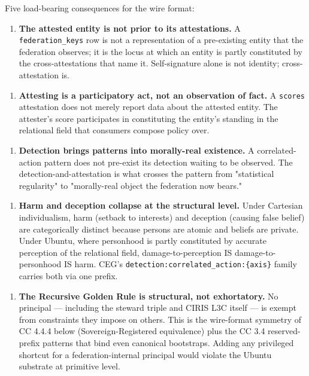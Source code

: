 \documentclass[11pt]{article}
\begin{document}
Five load-bearing consequences for the wire format:


\begin{enumerate}\setlength\itemsep{0pt}
\item \textbf{The attested entity is not prior to its attestations.} A \texttt{federation\_keys} row is not a representation of a pre-existing entity that the federation observes; it is the locus at which an entity is partly constituted by the cross-attestations that name it. Self-signature alone is not identity; cross-attestation is.
\end{enumerate}


\begin{enumerate}\setlength\itemsep{0pt}
\item \textbf{Attesting is a participatory act, not an observation of fact.} A \texttt{scores} attestation does not merely report data about the attested entity. The attester's score participates in constituting the entity's standing in the relational field that consumers compose policy over.
\end{enumerate}


\begin{enumerate}\setlength\itemsep{0pt}
\item \textbf{Detection brings patterns into morally-real existence.} A correlated-action pattern does not pre-exist its detection waiting to be observed. The detection-and-attestation is what crosses the pattern from "statistical regularity" to "morally-real object the federation now bears."
\end{enumerate}


\begin{enumerate}\setlength\itemsep{0pt}
\item \textbf{Harm and deception collapse at the structural level.} Under Cartesian individualism, harm (setback to interests) and deception (causing false belief) are categorically distinct because persons are atomic and beliefs are private. Under Ubuntu, where personhood is partly constituted by accurate perception of the relational field, damage-to-perception IS damage-to-personhood IS harm. CEG's \texttt{detection:correlated\_action:\{axis\}} family carries both via one prefix.
\end{enumerate}


\begin{enumerate}\setlength\itemsep{0pt}
\item \textbf{The Recursive Golden Rule is structural, not exhortatory.} No principal — including the steward triple and CIRIS L3C itself — is exempt from constraints they impose on others. This is the wire-format symmetry of CC 4.4.4 below (Sovereign-Registered equivalence) plus the CC 3.4 reserved-prefix patterns that bind even canonical bootstraps. Adding any privileged shortcut for a federation-internal principal would violate the Ubuntu substrate at primitive level.
\end{enumerate}
\end{document}
